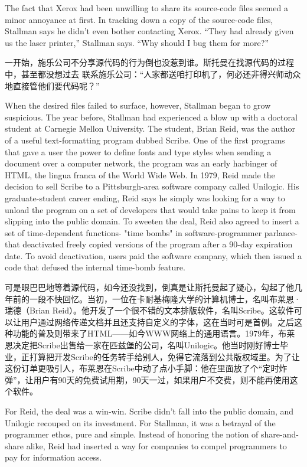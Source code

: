 \ifdefined\eng
The fact that Xerox had been unwilling to share its source-code files seemed a
minor annoyance at first. In tracking down a copy of the source-code files,
Stallman says he didn't even bother contacting Xerox. ``They had already given
us the laser printer,'' Stallman says. ``Why should I bug them for more?''
\fi

\ifdefined\chs
一开始，施乐公司不分享源代码的行为倒也没惹到谁。斯托曼在找源代码的过程中，甚至都没想过去
联系施乐公司：``人家都送咱打印机了，何必还非得兴师动众地直接管他们要代码呢？''
\fi

\ifdefined\eng
When the desired files failed to surface, however, Stallman began to grow suspicious. The year before, Stallman had experienced a blow up with a doctoral student at Carnegie Mellon University. The student, Brian Reid, was the author of a useful text-formatting program dubbed Scribe. One of the first programs that gave a user the power to define fonts and type styles when sending a document over a computer network, the program was an early harbinger of HTML, the lingua franca of the World Wide Web. In 1979, Reid made the decision to sell Scribe to a Pittsburgh-area software company called Unilogic. His graduate-student career ending, Reid says he simply was looking for a way to unload the program on a set of developers that would take pains to keep it from slipping into the public domain. To sweeten the deal, Reid also agreed to insert a set of time-dependent functions- "time bombs" in software-programmer parlance-that deactivated freely copied versions of the program after a 90-day expiration date. To avoid deactivation, users paid the software company, which then issued a code that defused the internal time-bomb feature.
\fi

\ifdefined\chs
可是眼巴巴地等着源代码，如今还没找到，倒真是让斯托曼起了疑心，勾起了他几年前的一段不快回忆。当初，一位在卡耐基梅隆大学的计算机博士，名叫布莱恩·瑞德（Brian Reid）。他开发了一个很不错的文本排版软件，名叫Scribe。这软件可以让用户通过网络传递文档并且还支持自定义的字体，这在当时可是首例。之后这种功能的普及则带来了HTML——如今WWW网络上的通用语言。1979年，布莱恩决定把Scribe出售给一家在匹兹堡的公司，名叫Unilogic。他当时刚好博士毕业，正打算把开发Scribe的任务转手给别人，免得它流落到公共版权域里。为了让这份订单更吸引人，布莱恩在Scribe中动了点小手脚：他在里面放了个``定时炸弹''，让用户有90天的免费试用期，90天一过，如果用户不交费，则不能再使用这个软件。
\fi

\ifdefined\eng
For Reid, the deal was a win-win. Scribe didn't fall into the public domain, and Unilogic recouped on its investment. For Stallman, it was a betrayal of the programmer ethos, pure and simple. Instead of honoring the notion of share-and-share alike, Reid had inserted a way for companies to compel programmers to pay for information access.
\fi

